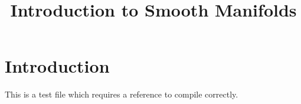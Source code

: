 


%


\title{Introduction to Smooth Manifolds}


\maketitle

\label{section-phantom}

\tableofcontents

\section{Introduction}
\label{section-introduction}

This is a test file which requires a reference to compile correctly. \cite{Maclane}







